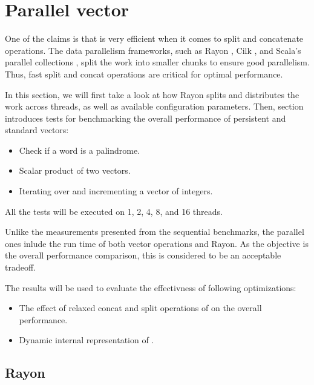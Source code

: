 
\section{Parallel vector}
One of the claims is that \rrbvec{} is very efficient when it comes to split and concatenate operations. The data parallelism frameworks, such as Rayon , Cilk , and Scala's parallel collections , split the work into smaller chunks to ensure good parallelism. Thus, fast split and concat operations are critical for optimal performance. 

In this section, we will first take a look at how Rayon splits and distributes the work across threads, as well as available configuration parameters. Then, section \todo{} introduces tests for benchmarking the overall performance of persistent and standard vectors:

\begin{itemize}    
    \item Check if a word is a palindrome. 
    \item Scalar product of two vectors.
    \item Iterating over and incrementing a vector of integers.
\end{itemize}

All the tests will be executed on 1, 2, 4, 8, and 16 threads. 

Unlike the measurements presented from the sequential benchmarks, the parallel ones inlude the run time of both vector operations and Rayon. As the objective is the overall performance comparison, this is considered to be an acceptable tradeoff. 

The results will be used to evaluate the effectivness of following optimizations:
\begin{itemize}
    \item The effect of relaxed concat and split operations of \rrbvec{} on the overall performance. 
    \item Dynamic internal representation of \pvec{}.     
\end{itemize}

\subsection{Rayon}


